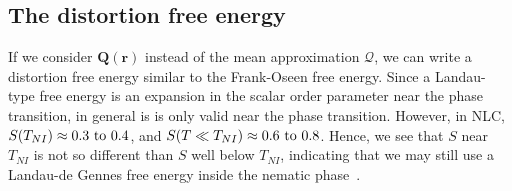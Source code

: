\subsection{The distortion free energy}
If we consider $\mathbf{Q}(\mathbf{r})$ instead of the mean approximation $\bm{\mathcal{Q}}$, we can write a distortion free energy similar to the Frank-Oseen free energy.
Since a Landau-type free energy is an expansion in the scalar order parameter near the phase transition, in general is is only valid near the phase transition.
However, in NLC, $S(T_{NI}) \approx 0.3 \textup{ to } 0.4$, and $S(T \ll T_{NI}) \approx 0.6 \textup{ to } 0.8$.
Hence, we see that $S$ near $T_{NI}$ is not so different than $S$ well below $T_{NI}$, indicating that we may still use a Landau-de Gennes free energy inside the nematic phase~\cite{RN198}.

